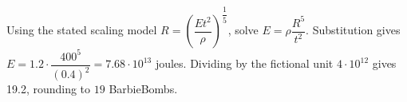 Using the stated scaling model $R=(\dfrac{Et^2}{\rho})^{\dfrac{1}{5}}$, solve $E=\rho \dfrac{R^5}{t^2}$. Substitution gives $E=1.2\cdot\dfrac{400^5}{(0.4)^2}=7.68\cdot10^{13}$ joules. Dividing by the fictional unit $4\cdot10^{12}$ gives 19.2, rounding to $\boxed{19}$ BarbieBombs.
